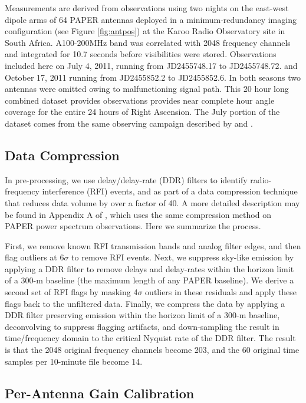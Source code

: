 \documentclass[preprint]{aastex}
\begin{document}
 Measurements are derived from observations using two nights on the east-west dipole arms of
64 PAPER antennas deployed in a minimum-redundancy imaging configuration
(see Figure \ref{fig:antpos})
at the Karoo Radio Observatory site in South Africa.
A100-200MHz band was correlated
with 2048 frequency channels and integrated for 10.7 seconds before
visibilities were stored.  Observations included here on  July 4, 2011, running
from JD2455748.17 to JD2455748.72. and October 17, 2011 running from
JD2455852.2 to JD2455852.6.  In both seasons two antennas were omitted owing to
malfunctioning signal path. This 20 hour long combined dataset provides
observations provides near complete hour angle coverage for the entire 24 hours of
Right Ascension. The July portion of the dataset comes from the same observing
campaign described by \cite{Pober:2013p9942} and \cite{Stefan:2013p9926}. 

\subsection{Data Compression}

In pre-processing, we use delay/delay-rate (DDR) filters
\citep{Parsons:2009p7859} to identify radio-frequency interference (RFI)
events, and as part of a data compression technique that reduces data volume by
over a factor of 40.  A more detailed description may be found in Appendix A of
\cite{Parsons:2013p9876}, which uses the same compression method on PAPER power
spectrum observations. Here we summarize the process.

First, we remove known RFI transmission bands and analog filter edges, and then
flag outliers at 6$\sigma$ to remove RFI events.  Next, we suppress sky-like
emission by applying a DDR filter to remove delays and delay-rates within the
horizon limit of a 300-m baseline (the maximum length of any PAPER baseline).
We derive a second set of RFI flags by masking 4$\sigma$ outliers in these
residuals and apply these flags back to the unfiltered data.  Finally, we
compress the data by applying a DDR filter preserving emission within the
horizon limit of a 300-m baseline, deconvolving to suppress flagging artifacts,
and down-sampling the result in time/frequency domain to the critical Nyquist
rate of the DDR filter.  The result is that the 2048 original frequency
channels become 203, and the 60 original time samples per 10-minute file become
14. 


\subsection{Per-Antenna Gain Calibration}
\end{document}
